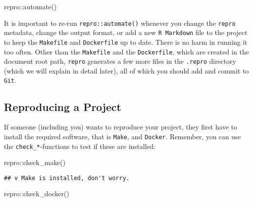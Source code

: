 \documentclass[psych,tutorial,accept,moreauthors,pdftex]{Definitions/mdpi}
\newenvironment{Shaded}{\begin{snugshade}}{\end{snugshade}}
\newcommand{\FunctionTok}[1]{\textcolor[rgb]{0.00,0.00,0.00}{#1}}
\newcommand{\NormalTok}[1]{#1}
\newcommand{\SpecialCharTok}[1]{\textcolor[rgb]{0.00,0.00,0.00}{#1}}
\begin{document}
\begin{paracol}{2}
\begin{adjustwidth}{0.5cm}{0cm} 
\begin{Shaded}
\begin{Highlighting}[]
\NormalTok{repro}\SpecialCharTok{::}\FunctionTok{automate}\NormalTok{()}
\end{Highlighting}
\end{Shaded}
\end{adjustwidth}

It is important to re-run \texttt{repro::automate()} whenever you change
the \texttt{repro} metadata, change the output format, or add a new
\texttt{R\ Markdown} file to the project to keep the \texttt{Makefile}
and \texttt{Dockerfile} up to date. There is no harm in running it too
often. Other than the \texttt{Makefile} and the \texttt{Dockerfile},
which are created in the document root path, \texttt{repro} generates a
few more files in the \texttt{.repro} directory (which we will explain
in detail later), all of which you should add and commit to
\texttt{Git}.

\subsection{Reproducing a Project}\label{reproducing-a-project}

If someone (including you) wants to reproduce your project, they first
have to install the required software, that is \texttt{Make}, and
\texttt{Docker}. Remember, you can use the \texttt{check\_*}-functions
to test if these are installed:

\begin{adjustwidth}{0.5cm}{0cm} 
\begin{Shaded}
\begin{Highlighting}[]
\NormalTok{repro}\SpecialCharTok{::}\FunctionTok{check\_make}\NormalTok{()}
\end{Highlighting}
\end{Shaded}


\begin{verbatim}
## v Make is installed, don't worry.
\end{verbatim}

\begin{Shaded}
\begin{Highlighting}[]
\NormalTok{repro}\SpecialCharTok{::}\FunctionTok{check\_docker}\NormalTok{()}
\end{Highlighting}
\end{Shaded}


\end{adjustwidth}
\end{paracol}
\end{document}
